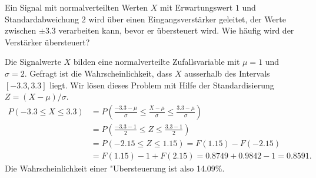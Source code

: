 Ein Signal mit normalverteilten Werten $X$ mit Erwartungswert
$1$ und Standardabweichung $2$ wird über einen Eingangsverstärker
geleitet, der Werte zwischen $\pm3.3$ verarbeiten kann, bevor
er übersteuert wird. Wie häufig wird der Verstärker übersteuert?


\begin{loesung}
Die Signalwerte $X$ bilden eine normalverteilte Zufallsvariable mit $\mu = 1$
und $\sigma=2$. Gefragt ist die Wahrscheinlichkeit, dass
$X$ ausserhalb des Intervals $[-3.3, 3.3]$ liegt. Wir lösen dieses
Problem mit Hilfe der Standardisierung $Z=(X-\mu)/\sigma$.
\begin{align*}
P(-3.3\le X\le 3.3)
&=
P\left(
\frac{-3.3-\mu }{\sigma}
\le
\frac{X-\mu}{\sigma}
\le
\frac{3.3-\mu }{\sigma}
\right)
\\
&=
P\left(
\frac{-3.3-1}{2}
\le
Z
\le
\frac{3.3-1}{2}
\right)
\\
&=P(-2.15 \le Z \le 1.15)
=F(1.15)-F(-2.15)\\
&=F(1.15)-1+F(2.15)
=0.8749+0.9842 - 1=0.8591.
\end{align*}
Die Wahrscheinlichkeit einer "Ubersteuerung ist also 14.09\%.
\end{loesung}

